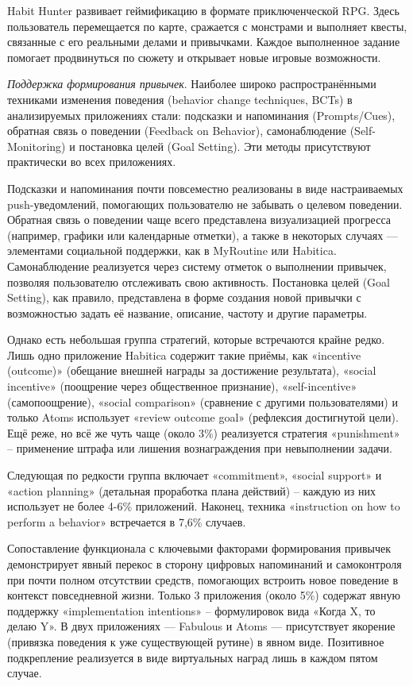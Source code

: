 \documentclass[pdflatex,sn-mathphys-num]{sn-jnl}%
\theoremstyle{thmstyleone}%
\theoremstyle{thmstyletwo}%
\theoremstyle{thmstylethree}%
\begin{document}
Habit Hunter развивает геймификацию в формате приключенческой RPG. Здесь пользователь перемещается по карте, сражается с монстрами и выполняет квесты, связанные с его реальными делами и привычками. Каждое выполненное задание помогает продвинуться по сюжету и открывает новые игровые возможности. 

\textit{Поддержка формирования привычек}. Наиболее широко распространёнными техниками изменения поведения (behavior change techniques, BCTs) в анализируемых приложениях стали: подсказки и напоминания (Prompts/Cues), обратная связь о поведении (Feedback on Behavior), самонаблюдение (Self-Monitoring) и постановка целей (Goal Setting). Эти методы присутствуют практически во всех приложениях.

Подсказки и напоминания почти повсеместно реализованы в виде настраиваемых push-уведомлений, помогающих пользователю не забывать о целевом поведении. Обратная связь о поведении чаще всего представлена визуализацией прогресса (например, графики или календарные отметки), а также в некоторых случаях — элементами социальной поддержки, как в MyRoutine или Habitica. Самонаблюдение реализуется через систему отметок о выполнении привычек, позволяя пользователю отслеживать свою активность. Постановка целей (Goal Setting), как правило, представлена в форме создания новой привычки с возможностью задать её название, описание, частоту и другие параметры.

Однако есть небольшая группа стратегий, которые встречаются крайне редко. Лишь одно приложение Habitica содержит такие приёмы, как «incentive (outcome)» (обещание внешней награды за достижение результата), «social incentive» (поощрение через общественное признание), «self-incentive» (самопоощрение), «social comparison» (сравнение с другими пользователями) и только Atoms использует «review outcome goal» (рефлексия достигнутой цели). Ещё реже, но всё же чуть чаще (около 3\%) реализуется стратегия «punishment» – применение штрафа или лишения вознаграждения при невыполнении задачи.

Следующая по редкости группа включает «commitment», «social support» и «action planning» (детальная проработка плана действий) – каждую из них использует не более 4-6\% приложений. Наконец, техника «instruction on how to perform a behavior» встречается в 7,6\% случаев.

Сопоставление функционала с ключевыми факторами формирования привычек демонстрирует явный перекос в сторону цифровых напоминаний и самоконтроля при почти полном отсутствии средств, помогающих встроить новое поведение в контекст повседневной жизни. Только 3 приложения (около 5\%) содержат явную поддержку «implementation intentions» – формулировок вида «Когда X, то делаю Y». В двух приложениях — Fabulous и Atoms — присутствует якорение (привязка поведения к уже существующей рутине) в явном виде. Позитивное подкрепление реализуется в виде виртуальных наград лишь в каждом пятом случае.
\end{document}
